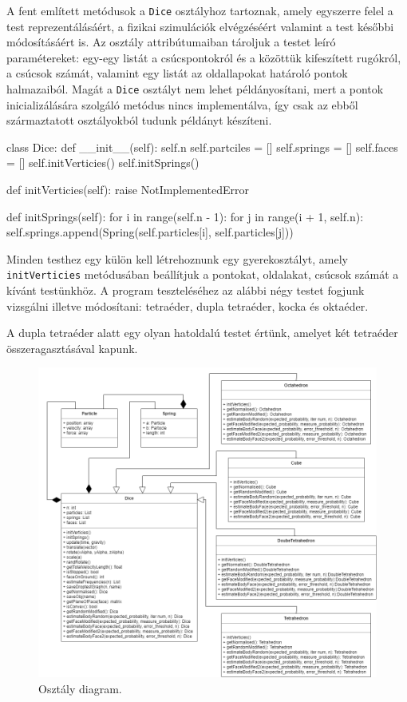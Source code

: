 A fent említett metódusok a \texttt{Dice} osztályhoz tartoznak, amely egyszerre felel a test reprezentálásáért, a fizikai szimulációk elvégzéséért valamint a test későbbi módosításáért is.
Az osztály attribútumaiban tároljuk a testet leíró paramétereket: egy-egy listát a csúcspontokról és a közöttük kifeszített rugókról, a csúcsok számát, valamint egy listát az oldallapokat határoló pontok halmazaiból.
Magát a \texttt{Dice} osztályt nem lehet példányosítani, mert a pontok inicializálására szolgáló metódus nincs implementálva, így csak az ebből származtatott osztályokból tudunk példányt készíteni.
\begin{python}
class Dice:
    def __init__(self):
        self.n
        self.partciles = []
        self.springs = []
        self.faces = []
        self.initVerticies()
        self.initSprings()

    def initVerticies(self):
        raise NotImplementedError

    def initSprings(self):
        for i in range(self.n - 1):
            for j in range(i + 1, self.n):
                	self.springs.append(Spring(self.particles[i],
                	                           self.particles[j]))
\end{python}
Minden testhez egy külön kell létrehoznunk egy gyerekosztályt, amely \texttt{initVerticies} metódusában beállítjuk a pontokat, oldalakat, csúcsok számát a kívánt testünkhöz.
A program teszteléséhez az alábbi négy testet fogjunk vizsgálni illetve módosítani: tetraéder, dupla tetraéder, kocka és oktaéder.
\begin{remark}
A dupla tetraéder alatt egy olyan hatoldalú testet értünk, amelyet két tetraéder összeragasztásával kapunk.
\end{remark}

\begin{figure}[h!]
	\centering
	\includegraphics[width=\textwidth]{images/uml.png}
	\caption{Osztály diagram.}
	\label{fig:uml}
\end{figure}

